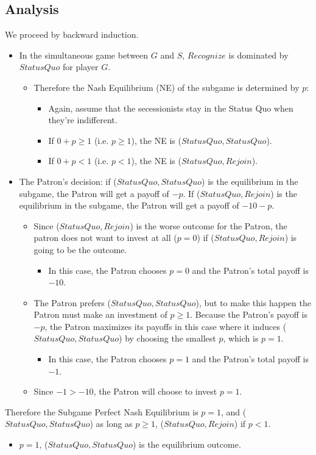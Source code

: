 \documentclass[12pt]{article}
\begin{document}
\subsection{Analysis}
We proceed by backward induction.
\begin{itemize}
	\item In the simultaneous game between $G$ and $S$, $Recognize$ is dominated by $Status Quo$ for player $G$.
		\begin{itemize}
			\item Therefore the Nash Equilibrium (NE) of the subgame is determined by $p$: 
				\begin{itemize}
					\item Again, assume that the secessionists stay in the Status Quo when they're indifferent.
					\item If $0+p \geq 1$ (i.e. $p \geq 1$), the NE is ($Status Quo,Status Quo$).
					\item If $0+p < 1$ (i.e. $p < 1$), the NE is ($Status Quo,Rejoin$).
				\end{itemize}
		\end{itemize}
	\item The Patron's decision: if ($Status Quo,Status Quo$) is the equilibrium in the subgame, the Patron will get a payoff of $-p$. If ($Status Quo,Rejoin$) is the equilibrium in the subgame, the Patron will get a payoff of $-10-p$.
		\begin{itemize}
			\item Since ($Status Quo,Rejoin$) is the worse outcome for the Patron, the patron does not want to invest at all ($p=0$) if ($Status Quo,Rejoin$) is going to be the outcome. 
				\begin{itemize}
					\item In this case, the Patron chooses $p=0$ and the Patron's total payoff is $-10$.
				\end{itemize}
			\item The Patron prefers ($Status Quo,Status Quo$), but to make this happen the Patron must make an investment of $p \geq 1$. Because the Patron's payoff is $-p$, the Patron maximizes its payoffs in this case where it induces ($Status Quo,Status Quo$) by choosing the smallest $p$, which is $p=1$. 
				\begin{itemize}
					\item In this case, the Patron chooses $p=1$ and the Patron's total payoff is $-1$.
				\end{itemize}
			\item Since $-1 > -10$, the Patron will choose to invest $p=1$.
		\end{itemize}
\end{itemize}
Therefore the Subgame Perfect Nash Equilibrium is $p=1$, and ($Status Quo,Status Quo$) as long as $p \geq 1$, ($Status Quo,Rejoin$) if $p < 1$.
\begin{itemize}
	\item $p=1$, ($Status Quo,Status Quo$) is the equilibrium outcome.
\end{itemize}
\end{document}
